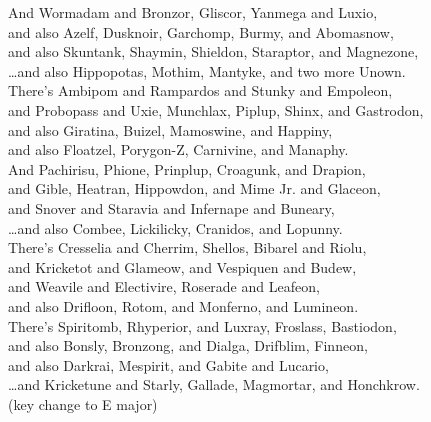 \documentclass{amsart}
\begin{document}
And Wormadam and Bronzor, Gliscor, Yanmega and Luxio,\\
and also Azelf, Dusknoir, Garchomp, Burmy, and Abomasnow,\\
and also Skuntank, Shaymin, Shieldon, Staraptor, and Magnezone,\\
\dots and also Hippopotas, Mothim, Mantyke, and two more Unown.\\

There's Ambipom and Rampardos and Stunky and Empoleon,\\
and Probopass and Uxie, Munchlax, Piplup, Shinx, and Gastrodon,\\
and also Giratina, Buizel, Mamoswine, and Happiny,\\
and also Floatzel, Porygon-Z, Carnivine, and Manaphy.\\

And Pachirisu, Phione, Prinplup, Croagunk, and Drapion,\\
and Gible, Heatran, Hippowdon, and Mime Jr. and Glaceon,\\
and Snover and Staravia and Infernape and Buneary,\\
\dots and also Combee, Lickilicky, Cranidos, and Lopunny.\\

There's Cresselia and Cherrim, Shellos, Bibarel and Riolu,\\
and Kricketot and Glameow, and Vespiquen and Budew,\\
and Weavile and Electivire, Roserade and Leafeon,\\
and also Drifloon, Rotom, and Monferno, and Lumineon.\\

There's Spiritomb, Rhyperior, and Luxray, Froslass, Bastiodon,\\
and also Bonsly, Bronzong, and Dialga, Drifblim, Finneon,\\
and also Darkrai, Mespirit, and Gabite and Lucario,\\
\dots and Kricketune and Starly, Gallade, Magmortar, and Honchkrow.\\



(key change to E major)\\
\end{document}
